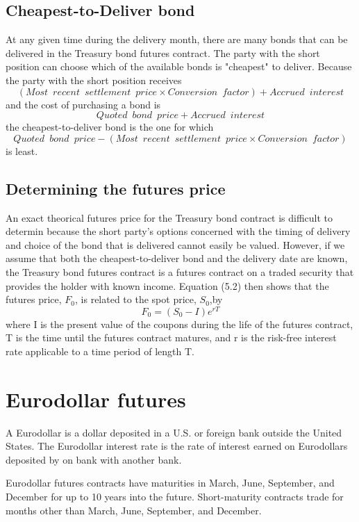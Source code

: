 \documentclass{article}
\begin{document}
\subsection{Cheapest-to-Deliver bond}
At any given time during the delivery month, there are many bonds that can be delivered in the Treasury bond futures contract. The party with the short position can choose which of the available bonds is "cheapest" to deliver. Because the party with the short position receives
\[
(Most\enspace recent\enspace settlement\enspace price\times Conversion\enspace factor)+Accrued\enspace interest
\]
and the cost of purchasing a bond is
\[
Quoted\enspace bond\enspace price+Accrued\enspace interest
\]
the cheapest-to-deliver bond is the one for which
\[
Quoted\enspace bond\enspace price-(Most\enspace recent\enspace settlement\enspace price \times Conversion\enspace factor)
\]
is least.

\subsection{Determining the futures price}
An exact theorical futures price for the Treasury bond contract is difficult to determin because the short party's options concerned with the timing of delivery and choice of the bond that is delivered cannot easily be valued. However, if we assume that both the cheapest-to-deliver bond and the delivery date are known, the Treasury bond futures contract is a futures contract on a traded security that provides the holder with known income. Equation (5.2) then shows that the futures price, $ F_0 $, is related to the spot price, $ S_0 $,by
\begin{equation}
	F_0=(S_0-I)e^{rT}
\end{equation}
where I is the present value of the coupons during the life of the futures contract, T is the time until the futures contract matures, and r is the risk-free interest rate applicable to a time period of length T.

\section{Eurodollar futures}
A Eurodollar is a dollar deposited in a U.S. or foreign bank outside the United States. The Eurodollar interest rate is the rate of interest earned on Eurodollars deposited by on bank with another bank.

Eurodollar futures contracts have maturities in March, June, September, and December for up to 10 years into the future. Short-maturity contracts trade for months other than March, June, September, and December.
\end{document}
